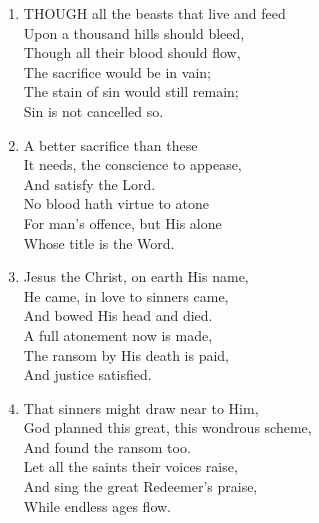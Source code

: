 \begin{enumerate}
    \item THOUGH all the beasts that live and feed \\
        Upon a thousand hills should bleed, \\
        Though all their blood should flow, \\
        The sacrifice would be in vain; \\
        The stain of sin would still remain; \\
        Sin is not cancelled so.

    \item A better sacrifice than these \\
        It needs, the conscience to appease, \\
        And satisfy the Lord. \\
        No blood hath virtue to atone \\
        For man's offence, but His alone \\
        Whose title is the Word.

    \item Jesus the Christ, on earth His name, \\
        He came, in love to sinners came, \\
        And bowed His head and died. \\
        A full atonement now is made, \\
        The ransom by His death is paid, \\
        And justice satisfied.

    \item That sinners might draw near to Him, \\
        God planned this great, this wondrous scheme, \\
        And found the ransom too. \\
        Let all the saints their voices raise, \\
        And sing the great Redeemer's praise, \\
        While endless ages flow.

\end{enumerate}

